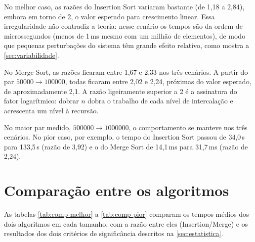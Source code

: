 \documentclass[
    12pt,
    oneside,
    a4paper,
    openany,
    chapter=TITLE,
    english,
    brazil
]{abntex2}
\begin{document}
No melhor caso, as razões do Insertion Sort variaram bastante (de 1,18 a 2,84), embora em torno de 2, o valor esperado para crescimento linear. Essa irregularidade não contradiz a teoria: nesse cenário os tempos são da ordem de microssegundos (menos de 1\,ms mesmo com um milhão de elementos), de modo que pequenas perturbações do sistema têm grande efeito relativo, como mostra a \autoref{sec:variabilidade}.

No Merge Sort, as razões ficaram entre 1,67 e 2,33 nos três cenários. A partir do par $\num{50000} \to \num{100000}$, todas ficaram entre 2,02 e 2,24, próximas do valor esperado, de aproximadamente 2,1. A razão ligeiramente superior a 2 é a assinatura do fator logarítmico: dobrar $n$ dobra o trabalho de cada nível de intercalação e acrescenta um nível à recursão.

No maior par medido, $\num{500000} \to \num{1000000}$, o comportamento se manteve nos três cenários. No pior caso, por exemplo, o tempo do Insertion Sort passou de 34,0\,s para 133,5\,s (razão de 3,92) e o do Merge Sort de 14,1\,ms para 31,7\,ms (razão de 2,24).

\section{Comparação entre os algoritmos}
\label{sec:comparacao}

As tabelas \ref{tab:comp-melhor} a \ref{tab:comp-pior} comparam os tempos médios dos dois algoritmos em cada tamanho, com a razão entre eles (Insertion/Merge) e os resultados dos dois critérios de significância descritos na \autoref{sec:estatistica}.

\begin{table}[H]
    \caption{Comparação entre os algoritmos no melhor caso}
    \label{tab:comp-melhor}
    \centering
    \small
    
\end{table}

\begin{table}[H]
    \caption{Comparação entre os algoritmos no caso médio}
    \label{tab:comp-medio}
    \centering
    \small
    
\end{table}

\begin{table}[H]
    \caption{Comparação entre os algoritmos no pior caso}
    \label{tab:comp-pior}
    \centering
    \small
    
\end{table}
\end{document}
